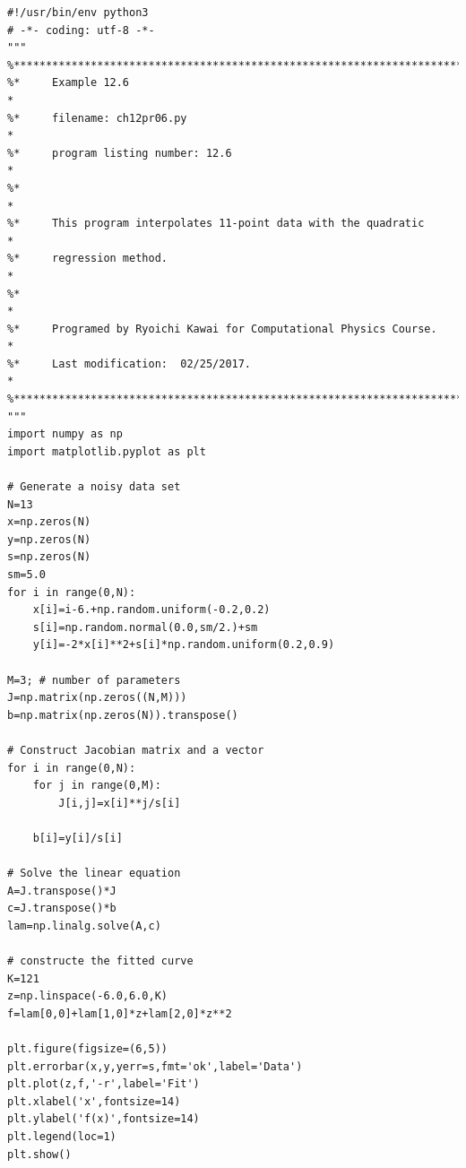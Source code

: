\bigskip
\noindent
\program
\footnotesize
\begin{verbatim}
#!/usr/bin/env python3
# -*- coding: utf-8 -*-
"""
%**************************************************************************
%*     Example 12.6                                                       *
%*     filename: ch12pr06.py                                              *
%*     program listing number: 12.6                                       *
%*                                                                        *
%*     This program interpolates 11-point data with the quadratic         *
%*     regression method.                                                 *
%*                                                                        *
%*     Programed by Ryoichi Kawai for Computational Physics Course.       *
%*     Last modification:  02/25/2017.                                    *
%**************************************************************************
"""
import numpy as np
import matplotlib.pyplot as plt

# Generate a noisy data set
N=13
x=np.zeros(N)
y=np.zeros(N)
s=np.zeros(N)
sm=5.0
for i in range(0,N):
    x[i]=i-6.+np.random.uniform(-0.2,0.2)
    s[i]=np.random.normal(0.0,sm/2.)+sm
    y[i]=-2*x[i]**2+s[i]*np.random.uniform(0.2,0.9)

M=3; # number of parameters
J=np.matrix(np.zeros((N,M)))
b=np.matrix(np.zeros(N)).transpose()

# Construct Jacobian matrix and a vector
for i in range(0,N):
    for j in range(0,M):
        J[i,j]=x[i]**j/s[i]

    b[i]=y[i]/s[i]

# Solve the linear equation
A=J.transpose()*J
c=J.transpose()*b
lam=np.linalg.solve(A,c)

# constructe the fitted curve
K=121
z=np.linspace(-6.0,6.0,K)
f=lam[0,0]+lam[1,0]*z+lam[2,0]*z**2

plt.figure(figsize=(6,5))
plt.errorbar(x,y,yerr=s,fmt='ok',label='Data')
plt.plot(z,f,'-r',label='Fit')
plt.xlabel('x',fontsize=14)
plt.ylabel('f(x)',fontsize=14)
plt.legend(loc=1)
plt.show()
\end{verbatim}
\normalsize


